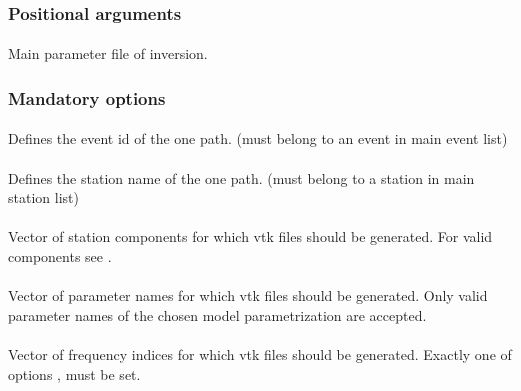 \subsubsection{Positional arguments}
\paragraph{}
Main parameter file of inversion.
\subsubsection{Mandatory options}
\paragraph{ }
Defines the event id of the one path. (must belong to an event in main event list)
\paragraph{ }
Defines the station name of the one path. (must belong to a station in main station list)
\paragraph{}
Vector of station components for which vtk files should be generated. For valid components see .
\paragraph{}
Vector of parameter names for which vtk files should be generated. Only valid parameter names of the chosen model parametrization are accepted. 
\paragraph{}
Vector of  frequency indices for which vtk files should be generated. 
Exactly one of options  ,  must be set.
